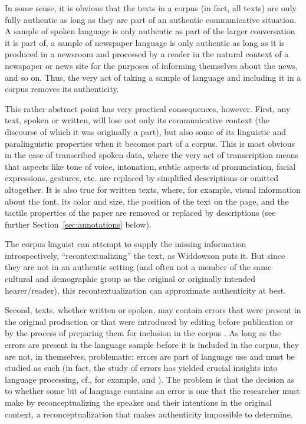 In some sense, it is obvious that the texts in a corpus (in fact, all texts) are only fully authentic  as long as they are part of an authentic communicative situation. A sample  of spoken  language is only authentic  as part of the larger conversation  it is part of, a sample of newspaper  language is only authentic as long as it is produced in a newsroom and processed by a reader in the natural context of a newspaper or news site for the purposes of informing themselves about the news, and so on. Thus, the very act of taking a sample of language and including it in a corpus removes its  authenticity.

This rather abstract point has very practical consequences, however. First, any text, spoken  or written, will lose not only its communicative context (the discourse of which it was originally a part), but also some of its linguistic and paralinguistic  properties when it becomes part of a corpus. This is most obvious in the case of transcribed  spoken data, where the very act of transcription means that aspects like tone of voice, intonation,  subtle aspects of pronunciation,  facial expressions, gestures, etc. are replaced by simplified descriptions or omitted altogether. It is also true for written  texts, where, for example, visual information about the font, its color and size, the position of the text on the page, and the tactile properties of the paper are removed or replaced by descriptions (see further Section~\ref{sec:annotations} below).

The corpus linguist can attempt to supply the missing information introspectively,  ``recontextualizing'' the text, as Widdowson puts it. But since they are not in an authentic  setting (and often not a member of the same cultural  and demographic  group as the original or originally intended hearer\slash reader), this recontextualization can approximate authenticity  at best.

Second, texts, whether written  or spoken, may contain errors that were present in the original production or that were introduced by editing before publication or by the process of preparing them for inclusion in the corpus \citep[cf. also][]{emons_corpus_1997}. As long as the errors are present in the language sample  before it is included in the corpus, they are not, in themselves, problematic: errors are part of language use and must be studied as such (in fact, the study of errors has yielded crucial insights into language processing, cf., for example, \citealt{fromkin_speech_1973} and \citealt{fromkin_errors_1980}). The problem is that the decision as to whether some bit of language contains an error is one that the researcher must make by reconceptualizing the speaker and their intentions in the original context, a reconceptualization that makes authenticity  impossible to determine.

